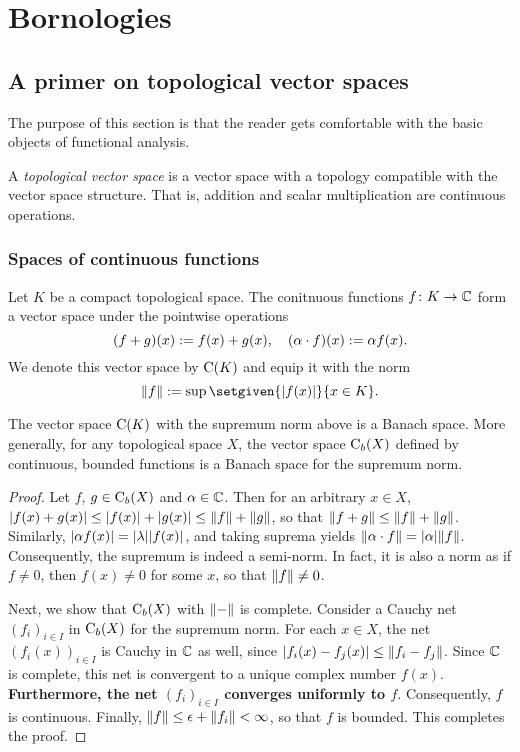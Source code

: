 \chapter{Bornologies}

\section{A primer on topological vector spaces}

The purpose of this section is that the reader gets comfortable with the basic objects of functional analysis.

\begin{definition}
A \textit{topological vector space} is a vector space with a topology compatible with the vector space structure. That is, addition and scalar multiplication are continuous operations. 
\end{definition}

\subsection{Spaces of continuous functions}

Let \(K\) be a compact topological space. The conitnuous functions \(f \colon K \to \mathbb C\) form a  vector space under the pointwise operations \[(f + g)(x) \mathrel{:=} f(x) + g(x), \quad (\alpha \cdot f)(x) \mathrel{:=} \alpha f(x).\] We denote this vector space by \(\mathrm{C}(K)\) and equip it with the norm \[\norm{f} \defeq \sup \setgiven{\abs{f(x)}}{x \in K}.\]  

\begin{proposition}\label{prop:cont-compact}
The vector space \(\mathrm{C}(K)\) with the supremum norm above is a Banach space. More generally, for any topological space \(X\), the vector space \(\mathrm{C}_b(X)\) defined by continuous, bounded functions is a Banach space for the supremum norm. 
\end{proposition}

\begin{proof}
Let \(f\), \(g \in \mathrm{C}_b(X)\) and \(\alpha \in \mathbb C\). Then for an arbitrary \(x \in X\),  \(\lvert f(x) + g(x)\rvert \leq \lvert f(x)\rvert + \lvert g(x)\rvert \leq \lVert f\rVert + \lVert g\rVert\), so that \(\lVert f + g\rVert \leq \lVert f\rVert + \lVert g\rVert\). Similarly, \(\lvert\alpha f(x)\rvert = \lvert\lambda\rvert \lvert f(x)\rvert\), and taking suprema yields \(\lVert\alpha \cdot f\rVert = \lvert\alpha\rvert \lVert f\rVert\). Consequently, the supremum is indeed a semi-norm. In fact, it is also a norm as if \(f \neq 0\), then \(f(x) \neq 0\) for some \(x\), so that \(\lVert f\rVert \neq 0\). 

Next, we show that \(\mathrm{C}_b(X)\) with \(\lVert-\rVert\) is complete. Consider a Cauchy net \((f_i)_{i \in I}\) in \(\mathrm{C}_b(X)\) for the supremum norm. For each \(x \in X\), the net \((f_i(x))_{i \in I}\) is Cauchy in \(\mathbb C\) as well, since \(\lvert f_i(x) - f_j(x)\rvert \leq \lVert f_i - f_j\rVert\). Since \(\mathbb C\) is complete, this net is convergent to a unique complex number \(f(x)\). \textbf{Furthermore, the net \((f_i)_{i \in I}\) converges uniformly to \(f\)}. Consequently, \(f\) is continuous. Finally, \(\lVert f\rVert \leq \epsilon + \lVert f_i\rVert < \infty\), so that \(f\) is bounded. This completes the proof.  
\end{proof}

